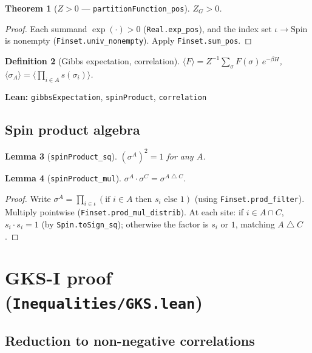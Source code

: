\documentclass[a4paper,11pt]{article}
\newtheorem{theorem}{Theorem}
\newtheorem{lemma}[theorem]{Lemma}
\newtheorem{definition}[theorem]{Definition}
\begin{document}
\begin{theorem}[$Z > 0$ --- \texttt{partitionFunction\_pos}]
$Z_G > 0$.
\end{theorem}

\begin{proof}
Each summand $\exp(\cdot) > 0$ (\texttt{Real.exp\_pos}), and the
index set $\iota \to \mathrm{Spin}$ is nonempty
(\texttt{Finset.univ\_nonempty}).
Apply \texttt{Finset.sum\_pos}.
\end{proof}

\begin{definition}[Gibbs expectation, correlation]
$\langle F \rangle = Z^{-1} \sum_\sigma F(\sigma)\,e^{-\beta H}$, \quad
$\langle \sigma_A \rangle = \langle \prod_{i \in A} s(\sigma_i) \rangle$.
\end{definition}

\noindent\textbf{Lean:} \texttt{gibbsExpectation},
\texttt{spinProduct}, \texttt{correlation}

\subsection{Spin product algebra}

\begin{lemma}[\texttt{spinProduct\_sq}]
$(\sigma^A)^2 = 1$ for any $A$.
\end{lemma}

\begin{lemma}[\texttt{spinProduct\_mul}]
$\sigma^A \cdot \sigma^C = \sigma^{A \bigtriangleup C}$.
\end{lemma}

\begin{proof}
Write $\sigma^A = \prod_{i \in \iota}
(\text{if } i \in A \text{ then } s_i \text{ else } 1)$
(using \texttt{Finset.prod\_filter}).
Multiply pointwise (\texttt{Finset.prod\_mul\_distrib}).
At each site: if $i \in A \cap C$, $s_i \cdot s_i = 1$ (by
\texttt{Spin.toSign\_sq}); otherwise the factor is $s_i$ or $1$,
matching $A \bigtriangleup C$.
\end{proof}

\section{GKS-I proof (\texttt{Inequalities/GKS.lean})}

\subsection{Reduction to non-negative correlations}
\end{document}
